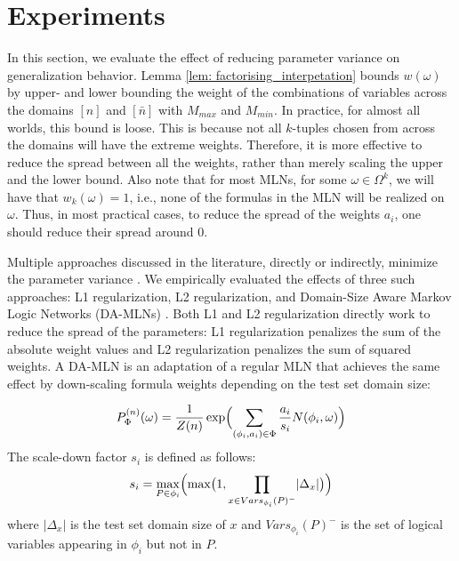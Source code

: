 

\section{Experiments}

In this section, we evaluate the effect of reducing parameter variance on generalization behavior. Lemma \ref{lem: factorising_interpetation} bounds $w(\omega)$ by upper- and lower bounding the weight of the combinations of variables across the domains $[n]$ and $[\bar{n}]$ with $M_{max}$ and $M_{min}$. In practice, for almost all worlds, this bound is loose. This is because not all $k$-tuples chosen from across the domains will have the extreme weights. Therefore, it is more effective to reduce the spread between all the weights, rather than merely scaling the upper and the lower bound. Also note that for most MLNs, for some $\omega \in \Omega^{k}$, we will have that $w_{k}(\omega)=1$, i.e., none of the formulas in the MLN will be realized on $\omega$. Thus, in most practical cases,  to reduce the spread of the weights $a_i$, one should reduce their spread around $0$.

Multiple approaches discussed in the literature, directly or indirectly, minimize the parameter variance  \cite{huynh2008discriminative,DA_MLN}. We empirically evaluated the effects of three such approaches: L1 regularization, L2 regularization, and Domain-Size Aware Markov Logic Networks (DA-MLNs) \cite{DA_MLN}. 
Both L1 and L2 regularization directly work to reduce the spread of the parameters: L1 regularization penalizes the sum of the absolute weight values and L2 regularization penalizes the sum of squared weights. A DA-MLN is an adaptation of a regular MLN that achieves the same effect by down-scaling formula weights depending on the test set domain size:

\begin{equation}
\label{eq: MLN}
    P^{(n)}_{\Phi}(\omega) = \frac{1}{Z(n)}\exp\Bigl(\sum_{(\phi_i,a_i)\in \Phi}\frac{a_i}{s_i} N(\phi_i,\omega)\Bigr)
\end{equation}
The scale-down factor $s_i$ is defined as follows:
\begin{align}
   s_i =  \underset{P \in \phi_i}{\max}\Bigl( \max\bigl(1,\underset{x \in Vars_{\phi_i}(P)^-}{\prod} \lvert\Delta_x\rvert\bigr)\Bigr)
\end{align}
where $\lvert \Delta_x \rvert$ is the test set domain size of $x$ and $Vars_{\phi_i}(P)^-$ is the set of logical variables appearing in $\phi_i$ but not in $P$.

